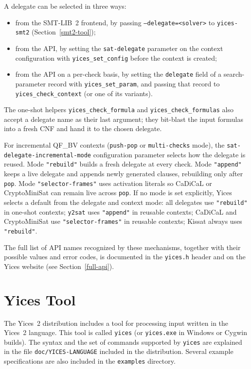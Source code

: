 \documentclass[11pt,twoside,fleqn,openright,titlepage]{cslreport}
\begin{document}
A delegate can be selected in three ways:
\begin{itemize}
\item from the SMT-LIB~2 frontend, by passing
  \texttt{--delegate=<solver>} to \texttt{yices-smt2}
  (Section~\ref{smt2-tool});
\item from the API, by setting the \texttt{sat-delegate} parameter on
  the context configuration with \texttt{yices\_set\_config} before
  the context is created;
\item from the API on a per-check basis, by setting the
  \texttt{delegate} field of a search-parameter record with
  \texttt{yices\_set\_param}, and passing that record to
  \texttt{yices\_check\_context} (or one of its variants).
\end{itemize}
The one-shot helpers \texttt{yices\_check\_formula} and
\texttt{yices\_check\_formulas} also accept a delegate name as their
last argument; they bit-blast the input formulas into a fresh CNF and
hand it to the chosen delegate.

For incremental QF\_BV contexts (\texttt{push-pop} or
\texttt{multi-checks} mode), the
\texttt{sat-delegate-\allowbreak{}incremental-\allowbreak{}mode} configuration parameter selects
how the delegate is reused. Mode \texttt{"rebuild"} builds a fresh
delegate at every check. Mode \texttt{"append"} keeps a live delegate
and appends newly generated clauses, rebuilding only after \texttt{pop}.
Mode \texttt{"selector-frames"} uses activation literals so CaDiCaL or
CryptoMiniSat can remain live across \texttt{pop}. If no mode is set
explicitly, Yices selects a default from the delegate and context mode:
all delegates use \texttt{"rebuild"} in one-shot contexts; \texttt{y2sat}
uses \texttt{"append"} in reusable contexts; CaDiCaL and CryptoMiniSat
use \texttt{"selector-frames"} in reusable contexts; Kissat always uses
\texttt{"rebuild"}.

The full list of API names recognized by these mechanisms, together
with their possible values and error codes, is documented in the
\texttt{yices.h} header and on the Yices website (see
Section~\ref{full-api}).




\chapter{Yices Tool}
\label{yices-shell}

The Yices~2 distribution includes  a tool for processing input written
in  the Yices~2  language.  This  tool is  called  \texttt{yices} (or
\texttt{yices.exe} in Windows or Cygwin builds). The
syntax  and  the  set  of  commands supported  by  \texttt{yices}  are
explained  in  the file  \texttt{doc/YICES-LANGUAGE}  included in  the
distribution. Several example specifications  are also included in the
\texttt{examples} directory.
\end{document}
